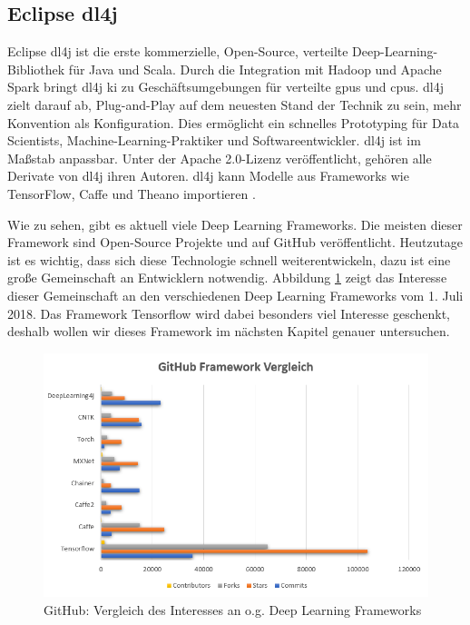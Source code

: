 \subsection{Eclipse \acl{dl4j}}
Eclipse \ac{dl4j} ist die erste kommerzielle, Open-Source, verteilte Deep-Learning-Bibliothek für Java und Scala. Durch die Integration mit Hadoop und Apache Spark bringt \ac{dl4j} \ac{ki} zu Geschäftsumgebungen für verteilte \ac{gpu}s und \ac{cpu}s. \ac{dl4j} zielt darauf ab, Plug-and-Play auf dem neuesten Stand der Technik zu sein, mehr Konvention als Konfiguration. Dies ermöglicht ein schnelles Prototyping für Data Scientists, Machine-Learning-Praktiker und Softwareentwickler. \ac{dl4j} ist im Maßstab anpassbar. Unter der Apache 2.0-Lizenz veröffentlicht, gehören alle Derivate von \ac{dl4j} ihren Autoren. \ac{dl4j} kann Modelle aus Frameworks wie TensorFlow, Caffe und Theano importieren \cite{dl4j}. \newline

Wie zu sehen, gibt es aktuell viele Deep Learning Frameworks. Die meisten dieser Framework sind Open-Source Projekte und auf GitHub veröffentlicht. Heutzutage ist es wichtig, dass sich diese Technologie schnell weiterentwickeln, dazu ist eine große Gemeinschaft an Entwicklern notwendig. Abbildung \ref{fig:githubinterestdeeplearning} zeigt das Interesse dieser Gemeinschaft an den verschiedenen Deep Learning Frameworks vom 1. Juli 2018. Das Framework Tensorflow wird dabei besonders viel Interesse geschenkt, deshalb wollen wir dieses Framework im nächsten Kapitel genauer untersuchen.

\begin{figure}
	\centering
	\includegraphics[width=0.9\linewidth]{Pictures/GitHubFrameworkVergleich}
	\caption[GitHub: Vergleich des Interesses in verschiedene Deep Learning Frameworks]{GitHub: Vergleich des Interesses an o.g. Deep Learning Frameworks}
	\label{fig:githubinterestdeeplearning}
\end{figure}
